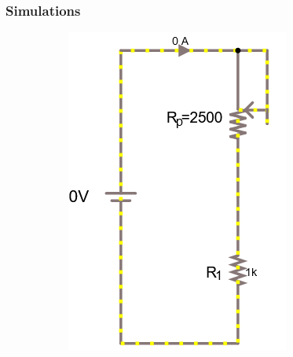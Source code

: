 \documentclass[a4paper]{article}
\begin{document}
\subsubsection{Simulations}
\begin{figure}[H]
    \begin{subfigure}{0.333\textwidth}
        \includegraphics[width=.9\linewidth]{amp0}
    \end{subfigure}
    \begin{subfigure}{0.333\textwidth}

\end{subfigure}
\end{figure}
\end{document}
